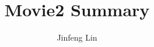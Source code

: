 \documentclass{article}
\begin{document}
\title{Movie2 Summary}
\author {Jinfeng Lin}
\maketitle
\clearpage
\indent \par
\end{document}

